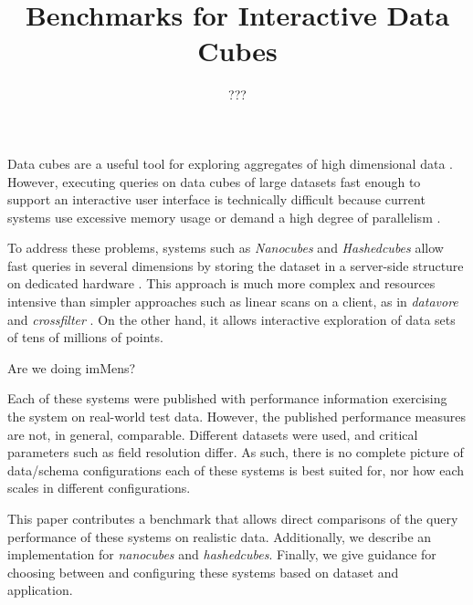 \documentclass[journal]{vgtc}                %
\title{Benchmarks for Interactive Data Cubes}
\author{???}
\begin{document}


\maketitle

Data cubes are a useful tool for exploring aggregates of high dimensional data \cite{data_cubes}. However, executing queries on data cubes of large datasets fast enough to support an interactive user interface is technically difficult because current systems use excessive memory usage or demand a high degree of parallelism \cite{nanocubes, parallel_paper}.

To address these problems, systems such as \textit{Nanocubes} and \textit{Hashedcubes} allow fast queries in several dimensions by storing the dataset in a server-side structure on dedicated hardware \cite{nanocube}\cite{hashedcube}. This approach is much more complex and resources intensive than simpler approaches such as linear scans on a client, as in \textit{datavore} and \textit{crossfilter} \cite{datavore,crossfilter}. On the other hand, it allows interactive exploration of data sets of tens of millions of points. 

Are we doing imMens?

Each of these systems were published with performance information exercising the system on real-world test data. However, the published performance measures are not, in general, comparable. Different datasets were used, and critical parameters such as field resolution differ. As such, there is no complete picture of data/schema configurations each of these systems is best suited for, nor how each scales in different configurations.

This paper contributes a benchmark that allows direct comparisons of the query performance of these systems on realistic data. Additionally, we describe an implementation for \textit{nanocubes} and \textit{hashedcubes}. Finally, we give guidance for choosing between and configuring these systems based on dataset and application.
\end{document}

